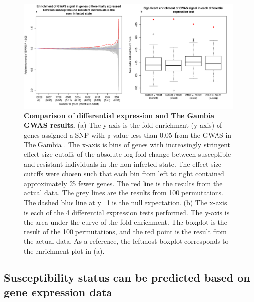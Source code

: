 \begin{figure}
\centering \includegraphics[width=5in]{img/ch03/gwas.pdf}
\caption[Comparison of differential expression and The Gambia GWAS
  results.]{ \textbf{Comparison of differential expression and The
    Gambia GWAS results.} (a) The y-axis is the fold enrichment
  (y-axis) of genes assigned a SNP with p-value less than 0.05 from
  the GWAS in The Gambia \citep{Thye2010}. The x-axis is bins of genes
  with increasingly stringent effect size cutoffs of the absolute log
  fold change between susceptible and resistant individuals in the
  non-infected state. The effect size cutoffs were chosen such that
  each bin from left to right contained approximately 25 fewer
  genes. The red line is the results from the actual data. The grey
  lines are the results from 100 permutations. The dashed blue line at
  y=1 is the null expectation. (b) The x-axis is each of the 4
  differential expression tests performed.  The y-axis is the area
  under the curve of the fold enrichment. The boxplot is the result of
  the 100 permutations, and the red point is the result from the
  actual data. As a reference, the leftmost boxplot corresponds to the
  enrichment plot in (a).  }
\label{fig:gwas}
\end{figure}

\subsection{Susceptibility status can be predicted based on gene expression data}

